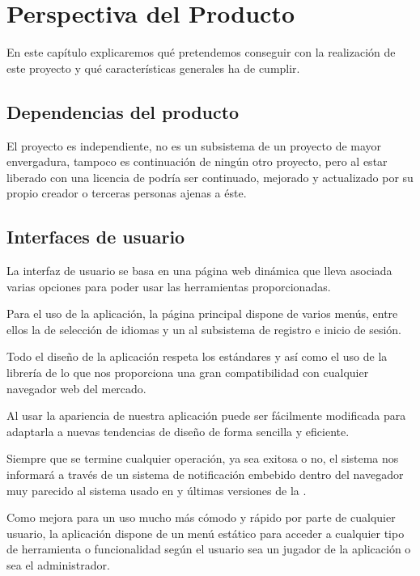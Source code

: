 \section{Perspectiva del Producto}
En este capítulo explicaremos qué pretendemos conseguir con la realización de
este proyecto y qué características generales ha de cumplir.

\subsection{Dependencias del producto}
El proyecto es independiente, no es un subsistema de un proyecto de mayor
envergadura, tampoco es continuación de ningún otro proyecto, pero al estar
liberado con una licencia de  podría ser continuado,
mejorado y actualizado por su propio creador o terceras personas ajenas a éste.

\subsection{Interfaces de usuario}
La interfaz de usuario se basa en una página web dinámica que lleva asociada
varias opciones para poder usar las herramientas proporcionadas.

Para el uso de la aplicación, la página principal dispone de varios menús, entre
ellos la de selección de idiomas y un  al subsistema de
registro e inicio de sesión.

Todo el diseño de la aplicación respeta los estándares  y
 así como el uso de la librería de 
lo que nos proporciona una gran compatibilidad con cualquier navegador web del
mercado.

Al usar  la apariencia de nuestra aplicación puede
ser fácilmente modificada para adaptarla a nuevas tendencias de diseño de forma
sencilla y eficiente.

Siempre que se termine cualquier operación, ya sea exitosa o no, el sistema nos
informará a través de un sistema de notificación embebido dentro del navegador
muy parecido al sistema usado en  y últimas versiones de la
.

Como mejora para un uso mucho más cómodo y rápido por parte de cualquier
usuario, la aplicación dispone de un menú estático para acceder a cualquier tipo
de herramienta o funcionalidad según el usuario sea un jugador de la aplicación
o sea el administrador.

